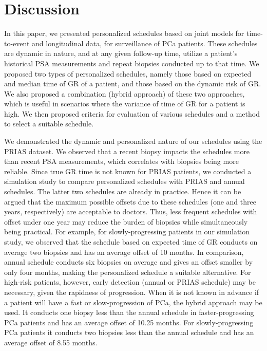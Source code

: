 
\section{Discussion}
\label{sec: discussion}
In this paper, we presented personalized schedules based on joint models for time-to-event and longitudinal data, for surveillance of PCa patients. These schedules are dynamic in nature, and at any given follow-up time, utilize a patient's historical PSA measurements and repeat biopsies conducted up to that time. We proposed two types of personalized schedules, namely those based on expected and median time of GR of a patient, and those based on the dynamic risk of GR. We also proposed a combination (hybrid approach) of these two approaches, which is useful in scenarios where the variance of time of GR for a patient is high. We then proposed criteria for evaluation of various schedules and a method to select a suitable schedule.

We demonstrated the dynamic and personalized nature of our schedules using the PRIAS dataset. We observed that a recent biopsy impacts the schedules more than recent PSA measurements, which correlates with biopsies being more reliable. Since true GR time is not known for PRIAS patients, we conducted a simulation study to compare personalized schedules with PRIAS and annual schedules. The latter two schedules are already in practice. Hence it can be argued that the maximum possible offsets due to these schedules (one and three years, respectively) are acceptable to doctors. Thus, less frequent schedules with offset under one year may reduce the burden of biopsies while simultaneously being practical. For example, for slowly-progressing patients in our simulation study, we observed that the schedule based on expected time of GR conducts on average two biopsies and has an average offset of 10 months. In comparison, annual schedule conducts six biopsies on average and gives an offset smaller by only four months, making the personalized schedule a suitable alternative. For high-risk patients, however, early detection (annual or PRIAS schedule) may be necessary, given the rapidness of progression. When it is not known in advance if a patient will have a fast or slow-progression of PCa, the hybrid approach may be used. It conducts one biopsy less than the annual schedule in faster-progressing PCa patients and has an average offset of 10.25 months. For slowly-progressing PCa patients it conducts two biopsies less than the annual schedule and has an average offset of 8.55 months.

